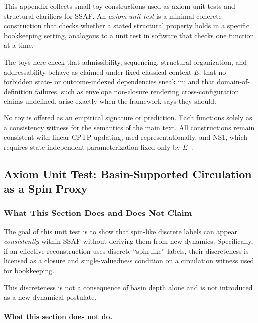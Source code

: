 \documentclass[aps,prx,onecolumn,11pt]{revtex4-2}
\theoremstyle{plain}
\theoremstyle{definition}
\theoremstyle{remark}
\begin{document}
This appendix collects small toy constructions used as axiom unit tests
and structural clarifiers for SSAF. An \emph{axiom unit test} is a
minimal concrete construction that checks whether a stated structural
property holds in a specific bookkeeping setting, analogous to a unit
test in software that checks one function at a time.

The toys here check that admissibility, sequencing, structural
organization, and addressability behave as claimed under fixed
classical context \(E\); that no forbidden state- or outcome-indexed
dependencies sneak in; and that domain-of-definition failures, such as
envelope non-closure rendering cross-configuration claims undefined,
arise exactly when the framework says they should.

No toy is offered as an empirical signature or prediction. Each
functions solely as a consistency witness for the semantics of the main
text. All constructions remain consistent with linear CPTP updating,
used representationally, and NS1, which requires state-independent
parameterization fixed only by \(E\)~\cite{Watrous2018,Wilde2017,
NielsenChuang2010}.

\subsection{Axiom Unit Test: Basin-Supported Circulation as a Spin Proxy}
\label{subsec:spin_closure_discreteness}

\subsubsection{What This Section Does and Does Not Claim}
\label{subsubsec:spin_quantization_admissibility}

The goal of this unit test is to show that spin-like discrete labels
can appear \emph{consistently} within SSAF without deriving them from
new dynamics. Specifically, if an effective reconstruction uses
discrete ``spin-like'' labels, their discreteness is licensed as a
closure and single-valuedness condition on a circulation witness used
for bookkeeping.

This discreteness is not a consequence of basin depth alone and is not
introduced as a new dynamical postulate.

\paragraph{What this section does not do.}
\end{document}
